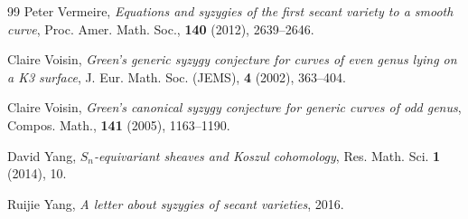 \documentclass[graybox]{svmult}
\begin{document}
\begin{thebibliography}{99}
Peter Vermeire, \textit{Equations and syzygies of the first secant variety to a smooth curve}, Proc. Amer. Math. Soc., \textbf{140} (2012), 2639--2646.
	
Claire Voisin, \textit{Green's generic syzygy conjecture for curves of even genus lying on a K3 surface}, J. Eur. Math. Soc. (JEMS), \textbf{4} (2002), 363--404.
	
Claire Voisin, \textit{Green's canonical syzygy conjecture for generic curves of odd genus}, Compos. Math., \textbf{141} (2005), 1163--1190.
	
David Yang, \textit{$S_n$-equivariant sheaves and Koszul cohomology}, Res. Math. Sci. \textbf{1} (2014), 10.

Ruijie Yang, \textit{A letter about syzygies of secant varieties}, 2016.


\end{thebibliography}
\end{document}

